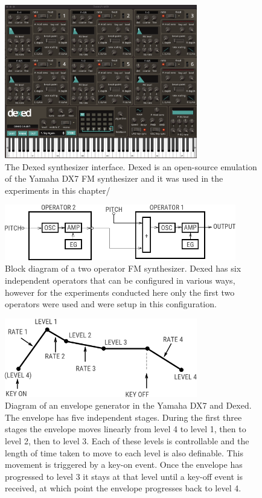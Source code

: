 \begin{figure}[ht]
    \centering
    \includegraphics[width=0.75\textwidth]{figures/spiegelib/dexed.png}
    \caption{The Dexed synthesizer interface. Dexed is an open-source emulation of the Yamaha DX7 FM synthesizer and it was used in the experiments in this chapter/}
    \label{fig:dexed}
\end{figure}

\begin{figure}[ht]
    \centering
    \includegraphics[width=0.9\textwidth]{figures/spiegelib/two_op_fm_block.png}
    \caption{Block diagram of a two operator FM synthesizer. Dexed has six independent operators that can be configured in various ways, however for the experiments conducted here only the first two operators were used and were setup in this configuration.}
    \label{fig:two_op_fm_block}
\end{figure}

\begin{figure}[ht]
    \centering
    \includegraphics[width=0.75\textwidth]{figures/spiegelib/Yamaha DX7 Envelope.png}
    \caption{Diagram of an envelope generator in the Yamaha DX7 and Dexed. The envelope has five independent stages. During the first three stages the envelope moves linearly from level 4 to level 1, then to level 2, then to level 3. Each of these levels is controllable and the length of time taken to move to each level is also definable. This movement is triggered by a key-on event. Once the envelope has progressed to level 3 it stays at that level until a key-off event is received, at which point the envelope progresses back to level 4.}
    \label{fig:dx7_envelope}
\end{figure}


